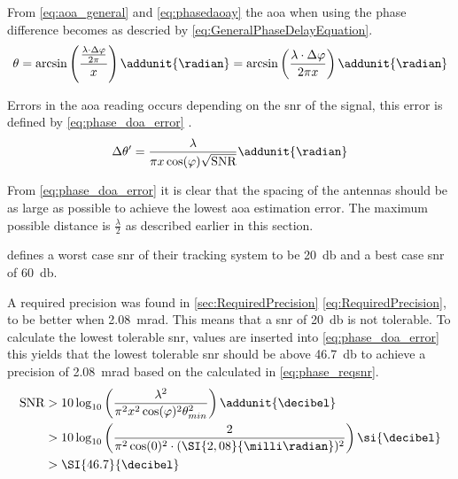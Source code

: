 From \autoref{eq:aoa_general} and \autoref{eq:phasedaoay} the \gls{aoa} when using the phase difference becomes as descried by \autoref{eq:GeneralPhaseDelayEquation}. 
\begin{equation} \label{eq:GeneralPhaseDelayEquation}
	\theta = \arcsin\left(\frac{\frac{\lambda\cdot\Delta\varphi}{2\pi}}{x}\right) \addunit{\radian}\\
			   = \arcsin\left(\frac{\lambda\cdot\Delta\varphi}{2\pi x}\right)\addunit{\radian}
\end{equation}
\startexplain
{}
\stopexplain

Errors in the \gls{aoa} reading occurs depending on the \gls{snr} of the signal, this error is defined by \autoref{eq:phase_doa_error} \citep[p. 43]{book:shinohara}. 
\begin{equation} \label{eq:phase_doa_error}
\Delta\theta ' = \frac{\lambda}{\pi x \cos(\varphi) \sqrt{\text{SNR}}} \addunit{\radian}
\end{equation}
\startexplain
{}
\stopexplain

From \autoref{eq:phase_doa_error} it is clear that the spacing of the antennas should be as large as possible to achieve the lowest \gls{aoa} estimation error. The maximum possible distance is $\frac{\lambda}{2}$ as described earlier in this section.

\cite{TechReport:DirectionFindingPaper} defines a worst case \gls{snr} of their tracking system to be \SI{20}{\decibel} and a best case \gls{snr} of \SI{60}{\decibel}.


A required precision was found in \autoref{sec:RequiredPrecision} \autoref{eq:RequiredPrecision}, to be better when \SI{2.08}{\milli\radian}. This means that a \gls{snr} of \SI{20}{\decibel} is not tolerable. 
To calculate the lowest tolerable \gls{snr}, values are inserted into \autoref{eq:phase_doa_error} this yields that  the lowest tolerable \gls{snr} should be above \SI{46.7}{\decibel} to achieve a precision of \SI{2.08}{\milli\radian} based on the calculated in \autoref{eq:phase_reqsnr}.
\begin{subequations} \label{eq:phase_reqsnr}
	\begin{align}
	\text{SNR} 	&> 10 \log_{10}\left(\frac{\lambda^2}{\pi^2x^2\cos(\varphi)^2\theta_{min}^2}\right) \addunit{\decibel}\\
			    &> 10 \log_{10}\left(\frac{2}{\pi^2\cos(0)^2 \cdot (\SI{2,08}{\milli\radian})^2}\right) \si{\decibel}\\
			    &> \SI{46.7}{\decibel}
	\end{align}
\end{subequations}

